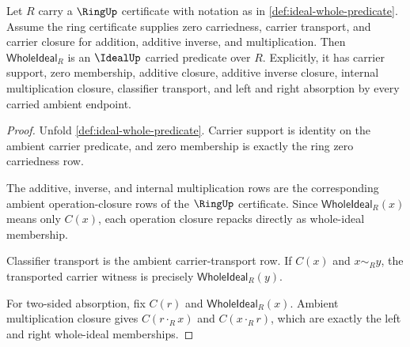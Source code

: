 \begin{theorem}
\label{thm:ideal-whole-predicate-ideal-closure}
Let $R$ carry a $\RingUp$ certificate with notation as in \autoref{def:ideal-whole-predicate}. Assume the ring certificate supplies zero carriedness, carrier transport, and carrier closure for addition, additive inverse, and multiplication. Then $\mathsf{WholeIdeal}_R$ is an $\IdealUp$ carried predicate over $R$. Explicitly, it has carrier support, zero membership, additive closure, additive inverse closure, internal multiplication closure, classifier transport, and left and right absorption by every carried ambient endpoint.
\end{theorem}
\begin{proof}
Unfold \autoref{def:ideal-whole-predicate}. Carrier support is identity on the ambient carrier predicate, and zero membership is exactly the ring zero carriedness row.

The additive, inverse, and internal multiplication rows are the corresponding ambient operation-closure rows of the $\RingUp$ certificate. Since $\mathsf{WholeIdeal}_R(x)$ means only $C(x)$, each operation closure repacks directly as whole-ideal membership.

Classifier transport is the ambient carrier-transport row. If $C(x)$ and $x\sim_Ry$, the transported carrier witness is precisely $\mathsf{WholeIdeal}_R(y)$.

For two-sided absorption, fix $C(r)$ and $\mathsf{WholeIdeal}_R(x)$. Ambient multiplication closure gives $C(r\cdot_Rx)$ and $C(x\cdot_Rr)$, which are exactly the left and right whole-ideal memberships.
\end{proof}


